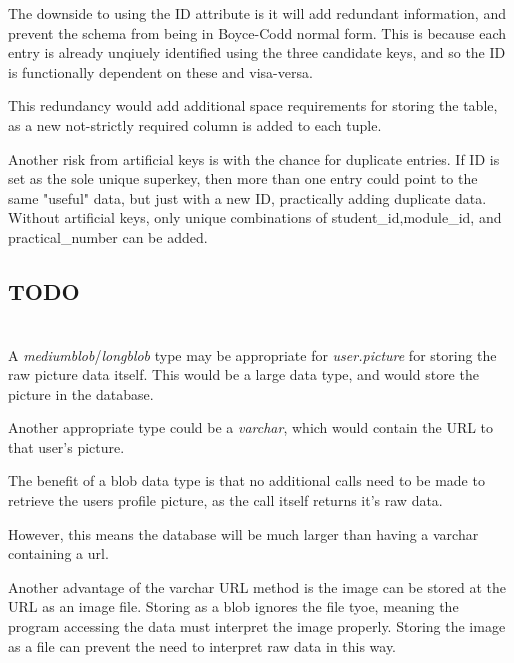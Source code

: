\documentclass[11pt]{article}
\begin{document}
    The downside to using the ID attribute is it will add redundant
    information, and prevent the schema from being in Boyce-Codd normal form.
    This is because each entry is already unqiuely identified using the three
    candidate keys, and so the ID is functionally dependent on these and
    visa-versa.

    This redundancy would add additional space requirements for storing the
    table, as a new not-strictly required column is added to each tuple.

    Another risk from artificial keys is with the chance for duplicate entries.
    If ID is set as the sole unique superkey, then more than one entry could
    point to the same "useful" data, but just with a new ID, practically adding
    duplicate data. Without artificial keys, only unique combinations of
    student\_id,module\_id, and practical\_number can be added.

    \subsection{TODO}


\section{}

\subsection{}

A \textit{mediumblob}/\textit{longblob} type may be appropriate for \textit{user.picture} for
storing the raw picture data itself. This would be a large data type, and would
store the picture in the database.

Another appropriate type could be a \textit{varchar}, which would contain the
URL to that user's picture. 

The benefit of a blob data type is that no additional calls need to be made to
retrieve the users profile picture, as the call itself returns it's raw data.

However, this means the database will be much larger than having a varchar
containing a url.

Another advantage of the varchar URL method is the image can
be stored at the URL as an image file. Storing as a blob ignores the file tyoe,
meaning the program accessing the data must interpret the image properly.
Storing the image as a file can prevent the need to interpret raw data in this
way.
\end{document}
